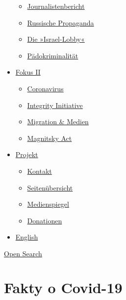 \begin{itemize}
  \begin{itemize}
  \tightlist
  \item
    \href{https://swprs.org/bericht-eines-journalisten/}{Journalistenbericht}
  \item
    \href{https://swprs.org/russische-propaganda/}{Russische Propaganda}
  \item
    \href{https://swprs.org/die-israel-lobby-fakten-und-mythen/}{Die
    »Israel-Lobby«}
  \item
    \href{https://swprs.org/geopolitik-und-paedokriminalitaet/}{Pädokriminalität}
  \end{itemize}
\item
  \href{https://swprs.org/migration-und-medien/}{Fokus II}

  \begin{itemize}
  \tightlist
  \item
    \href{https://swprs.org/covid-19-hinweis-ii/}{Coronavirus}
  \item
    \href{https://swprs.org/die-integrity-initiative/}{Integrity
    Initiative}
  \item
    \href{https://swprs.org/migration-und-medien/}{Migration \& Medien}
  \item
    \href{https://swprs.org/der-fall-magnitsky/}{Magnitsky Act}
  \end{itemize}
\item
  \href{https://swprs.org/kontakt/}{Projekt}

  \begin{itemize}
  \tightlist
  \item
    \href{https://swprs.org/kontakt/}{Kontakt}
  \item
    \href{https://swprs.org/uebersicht/}{Seitenübersicht}
  \item
    \href{https://swprs.org/medienspiegel/}{Medienspiegel}
  \item
    \href{https://swprs.org/donationen/}{Donationen}
  \end{itemize}
\item
  \href{https://swprs.org/contact/}{English}
\end{itemize}

\protect\hyperlink{}{Open Search}

\hypertarget{fakty-o-covid-19}{%
\section{Fakty o Covid-19}\label{fakty-o-covid-19}}

